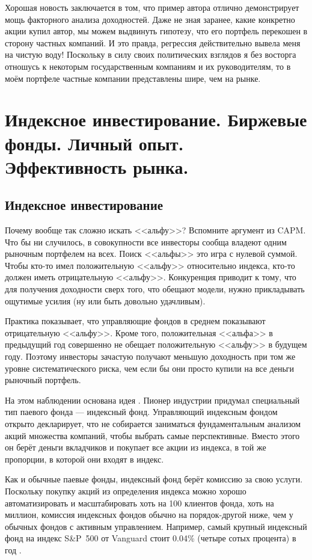 Хорошая новость заключается в том, что пример автора отлично демонстрирует мощь факторного анализа доходностей. Даже не зная заранее, какие конкретно акции купил автор, мы можем выдвинуть гипотезу, что его портфель перекошен в сторону частных компаний. И это правда, регрессия действительно вывела меня на чистую воду! Поскольку в силу своих политических взглядов я без восторга отношусь к некоторым государственным компаниям и их руководителям, то в моём портфеле частные компании представлены шире, чем на рынке.

\section{Индексное инвестирование. Биржевые фонды. Личный опыт. Эффективность рынка.}

\subsection{Индексное инвестирование}

Почему вообще так сложно искать <<альфу>>? Вспомните аргумент из CAPM. Что бы ни случилось, в совокупности все инвесторы сообща владеют одним рыночным портфелем на всех. Поиск <<альфы>> это игра с нулевой суммой. Чтобы кто-то имел положительную <<альфу>> относительно индекса, кто-то должен иметь отрицательную <<альфу>>. Конкуренция приводит к тому, что для получения доходности сверх того, что обещают модели, нужно прикладывать ощутимые усилия (ну или быть довольно удачливым).

Практика показывает, что управляющие фондов в среднем показывают отрицательную <<альфу>>. Кроме того, положительная <<альфа>> в предыдущий год совершенно не обещает положительную <<альфу>> в будущем году. Поэтому инвесторы зачастую получают меньшую доходность при том же уровне систематического риска, чем если бы они просто купили на все деньги рыночный портфель.

На этом наблюдении основана идея . Пионер индустрии  придумал специальный тип паевого фонда --- индексный фонд. Управляющий индексным фондом открыто декларирует, что не собирается заниматься фундаментальным анализом акций множества компаний, чтобы выбрать самые перспективные. Вместо этого он берёт деньги вкладчиков и покупает все акции из индекса, в той же пропорции, в которой они входят в индекс.

Как и обычные паевые фонды, индексный фонд берёт комиссию за свою услуги. Поскольку покупку акций из определения индекса можно хорошо автоматизировать и масштабировать хоть на 100 клиентов фонда, хоть на миллион, комиссия индексных фондов обычно на порядок-другой ниже, чем у обычных фондов с активным управлением. Например, самый крупный индексный фонд на индекс S\&P~500 от Vanguard стоит 0.04\% (четыре сотых процента) в год \cite{vanguard500}.

